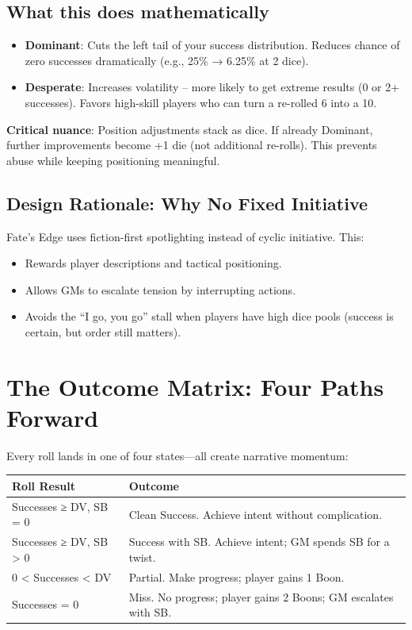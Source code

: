 \documentclass[11pt]{article}
\begin{document}
\subsection{What this does mathematically}
\begin{itemize}
    \item \textbf{Dominant}: Cuts the left tail of your success distribution. Reduces chance of zero successes dramatically (e.g., 25\% → 6.25\% at 2 dice).
    \item \textbf{Desperate}: Increases volatility – more likely to get extreme results (0 or 2+ successes). Favors high-skill players who can turn a re-rolled 6 into a 10.
\end{itemize}

\textbf{Critical nuance}: Position adjustments stack as dice. If already Dominant, further improvements become +1 die (not additional re-rolls). This prevents abuse while keeping positioning meaningful.

\subsection{Design Rationale: Why No Fixed Initiative}
Fate's Edge uses fiction-first spotlighting instead of cyclic initiative. This:
\begin{itemize}
    \item Rewards player descriptions and tactical positioning.
    \item Allows GMs to escalate tension by interrupting actions.
    \item Avoids the “I go, you go” stall when players have high dice pools (success is certain, but order still matters).
\end{itemize}

\section{The Outcome Matrix: Four Paths Forward}

Every roll lands in one of four states—all create narrative momentum:

\begin{table}[h]
\centering
\begin{tabular}{ll}
\toprule
\textbf{Roll Result} & \textbf{Outcome} \\
\midrule
Successes ≥ DV, SB = 0 & Clean Success. Achieve intent without complication. \\
Successes ≥ DV, SB > 0 & Success with SB. Achieve intent; GM spends SB for a twist. \\
0 < Successes < DV & Partial. Make progress; player gains 1 Boon. \\
Successes = 0 & Miss. No progress; player gains 2 Boons; GM escalates with SB. \\
\bottomrule
\end{tabular}
\end{table}
\end{document}

